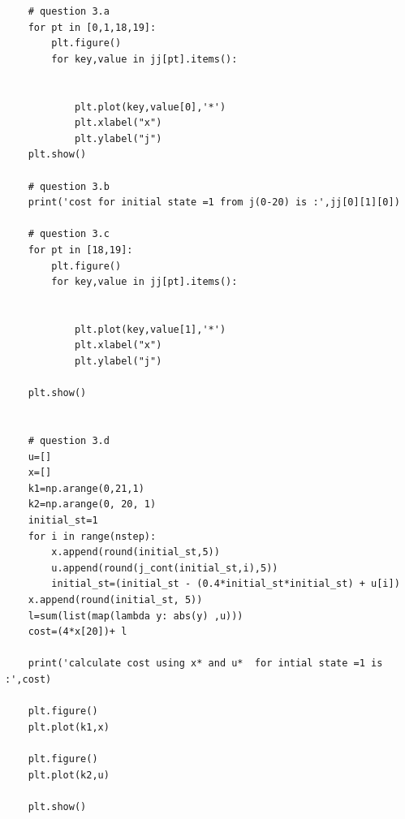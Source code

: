 \documentclass[12pt]{article}
\begin{document}
\begin{lstlisting}
    # question 3.a
    for pt in [0,1,18,19]:
        plt.figure()
        for key,value in jj[pt].items():


            plt.plot(key,value[0],'*')
            plt.xlabel("x")
            plt.ylabel("j")
    plt.show()

    # question 3.b
    print('cost for initial state =1 from j(0-20) is :',jj[0][1][0])

    # question 3.c
    for pt in [18,19]:
        plt.figure()
        for key,value in jj[pt].items():


            plt.plot(key,value[1],'*')
            plt.xlabel("x")
            plt.ylabel("j")

    plt.show()


    # question 3.d
    u=[]
    x=[]
    k1=np.arange(0,21,1)
    k2=np.arange(0, 20, 1)
    initial_st=1
    for i in range(nstep):
        x.append(round(initial_st,5))
        u.append(round(j_cont(initial_st,i),5))
        initial_st=(initial_st - (0.4*initial_st*initial_st) + u[i])
    x.append(round(initial_st, 5))
    l=sum(list(map(lambda y: abs(y) ,u)))
    cost=(4*x[20])+ l

    print('calculate cost using x* and u*  for intial state =1 is :',cost)

    plt.figure()
    plt.plot(k1,x)

    plt.figure()
    plt.plot(k2,u)

    plt.show()







\end{lstlisting}
\end{document}
